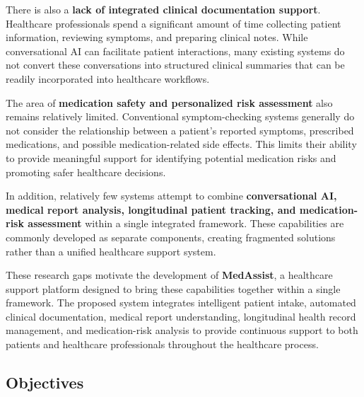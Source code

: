 \documentclass[conference]{IEEEtran}
\begin{document}
There is also a \textbf{lack of integrated clinical documentation support}. Healthcare professionals spend a significant amount of time collecting patient information, reviewing symptoms, and preparing clinical notes. While conversational AI can facilitate patient interactions, many existing systems do not convert these conversations into structured clinical summaries that can be readily incorporated into healthcare workflows.

The area of \textbf{medication safety and personalized risk assessment} also remains relatively limited. Conventional symptom-checking systems generally do not consider the relationship between a patient's reported symptoms, prescribed medications, and possible medication-related side effects. This limits their ability to provide meaningful support for identifying potential medication risks and promoting safer healthcare decisions.

In addition, relatively few systems attempt to combine \textbf{conversational AI, medical report analysis, longitudinal patient tracking, and medication-risk assessment} within a single integrated framework. These capabilities are commonly developed as separate components, creating fragmented solutions rather than a unified healthcare support system.

These research gaps motivate the development of \textbf{MedAssist}, a healthcare support platform designed to bring these capabilities together within a single framework. The proposed system integrates intelligent patient intake, automated clinical documentation, medical report understanding, longitudinal health record management, and medication-risk analysis to provide continuous support to both patients and healthcare professionals throughout the healthcare process.


\subsection{Objectives}
\end{document}
